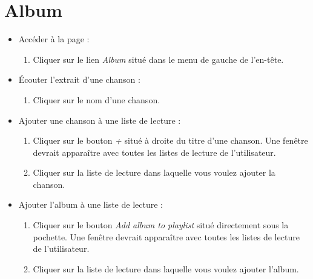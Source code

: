 \documentclass[12pt, letterpaper]{article}
\begin{document}
    \section*{Album}
    \begin{itemize}
        \item Accéder à la page :
        \begin{enumerate}
            \item Cliquer sur le lien \textit{Album} situé dans le menu de gauche de l'en-tête.
        \end{enumerate}

        \item Écouter l'extrait d'une chanson :
        \begin{enumerate}
            \item Cliquer sur le nom d'une chanson.
        \end{enumerate}

        \item Ajouter une chanson à une liste de lecture :
        \begin{enumerate}
            \item Cliquer sur le bouton \textit{+} situé à droite du titre d'une chanson. Une fenêtre devrait apparaître avec toutes les listes de lecture de l'utilisateur.

            \item Cliquer sur la liste de lecture dans laquelle vous voulez ajouter la chanson.
        \end{enumerate}

        \item Ajouter l'album à une liste de lecture :
        \begin{enumerate}
            \item Cliquer sur le bouton \textit{Add album to playlist} situé directement sous la pochette. Une fenêtre devrait apparaître avec toutes les listes de lecture de l'utilisateur.

            \item Cliquer sur la liste de lecture dans laquelle vous voulez ajouter l'album.
        \end{enumerate}
    \end{itemize}
\end{document}
